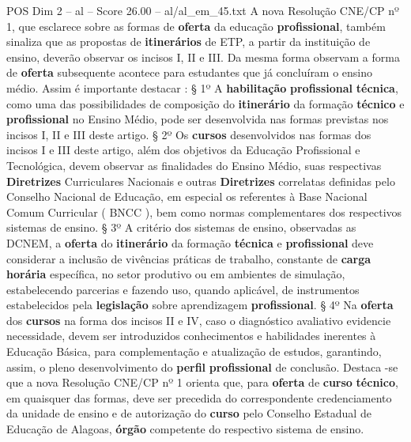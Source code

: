 \begin{textsample}{POS Dim 2 – al – Score 26.00 – al/al\_em\_45.txt}
A nova Resolução CNE/CP nº 1, que esclarece sobre as formas de \textbf{oferta} da educação \textbf{profissional}, também sinaliza que as propostas de \textbf{itinerários} de ETP, a partir da instituição de ensino, deverão observar os incisos I, II e III.
Da mesma forma observam a forma de \textbf{oferta} subsequente acontece para estudantes que já concluíram o ensino médio.
Assim é importante destacar : § 1º A \textbf{habilitação} \textbf{profissional} \textbf{técnica}, como uma das possibilidades de composição do \textbf{itinerário} da formação \textbf{técnico} e \textbf{profissional} no Ensino Médio, pode ser desenvolvida nas formas previstas nos incisos I, II e III deste artigo. § 2º Os \textbf{cursos} desenvolvidos nas formas dos incisos I e III deste artigo, além dos objetivos da Educação Profissional e Tecnológica, devem observar as finalidades do Ensino Médio, suas respectivas \textbf{Diretrizes} Curriculares Nacionais e outras \textbf{Diretrizes} correlatas definidas pelo Conselho Nacional de Educação, em especial os referentes à Base Nacional Comum Curricular ( BNCC ), bem como normas complementares dos respectivos sistemas de ensino. § 3º A critério dos sistemas de ensino, observadas as DCNEM, a \textbf{oferta} do \textbf{itinerário} da formação \textbf{técnica} e \textbf{profissional} deve considerar a inclusão de vivências práticas de trabalho, constante de \textbf{carga} \textbf{horária} específica, no setor produtivo ou em ambientes de simulação, estabelecendo parcerias e fazendo uso, quando aplicável, de instrumentos estabelecidos pela \textbf{legislação} sobre aprendizagem \textbf{profissional}. § 4º Na \textbf{oferta} dos \textbf{cursos} na forma dos incisos II e IV, caso o diagnóstico avaliativo evidencie necessidade, devem ser introduzidos conhecimentos e habilidades inerentes à Educação Básica, para complementação e atualização de estudos, garantindo, assim, o pleno desenvolvimento do \textbf{perfil} \textbf{profissional} de conclusão.
Destaca -se que a nova Resolução CNE/CP nº 1 orienta que, para \textbf{oferta} de \textbf{curso} \textbf{técnico}, em quaisquer das formas, deve ser precedida do correspondente credenciamento da unidade de ensino e de autorização do \textbf{curso} pelo Conselho Estadual de Educação de Alagoas, \textbf{órgão} competente do respectivo sistema de ensino.

\end{textsample}
